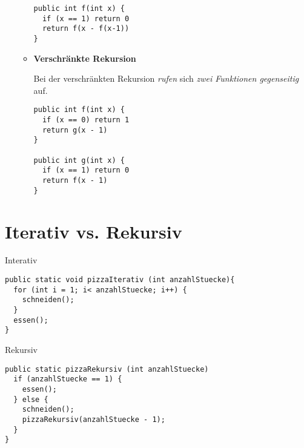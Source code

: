 \documentclass{lehramt-informatik-haupt}
\begin{document}
\begin{itemize}
\begin{itemize}
\begin{verbatim}
public int f(int x) {
  if (x == 1) return 0
  return f(x - f(x-1))
}
\end{verbatim}

%

\item \textbf{Verschränkte Rekursion}

Bei der verschränkten Rekursion \emph{rufen} sich \emph{zwei Funktionen
gegenseitig} auf.

\begin{verbatim}
public int f(int x) {
  if (x == 0) return 1
  return g(x - 1)
}

public int g(int x) {
  if (x == 1) return 0
  return f(x - 1)
}
\end{verbatim}
\end{itemize}
\end{itemize}

%

\section{Iterativ vs. Rekursiv}

\cite[Seite 16-19 (Gedruckte Seitenzahlen stimmen nicht)]{aud:fs:1}

Interativ

\begin{verbatim}
public static void pizzaIterativ (int anzahlStuecke){
  for (int i = 1; i< anzahlStuecke; i++) {
    schneiden();
  }
  essen();
}
\end{verbatim}

Rekursiv

\begin{verbatim}
public static pizzaRekursiv (int anzahlStuecke)
  if (anzahlStuecke == 1) {
    essen();
  } else {
    schneiden();
    pizzaRekursiv(anzahlStuecke - 1);
  }
}
\end{verbatim}

\literatur
\end{document}
